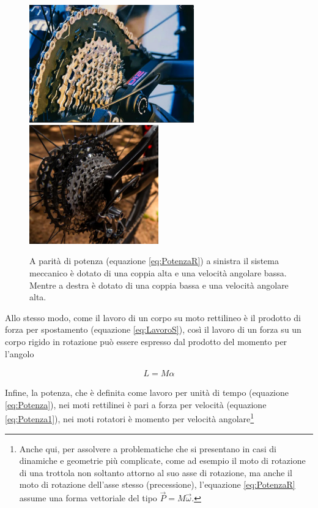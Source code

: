 \documentclass[17pt]{extarticle}
\begin{document}
\begin{figure}[ht!]		
	\centering
   	\includegraphics[width=2.8in]{coppiaAlta.png}
   	\includegraphics[width=2.2in]{coppiaBassa.png}
  	\caption{A parità di potenza (equazione \ref{eq:PotenzaR}) a sinistra il sistema meccanico è dotato di una coppia alta e una velocità angolare bassa. Mentre a destra è dotato di una coppia bassa e una velocità angolare alta.}
   	\label{fig:coppiaBassaAlta}
\end{figure}


Allo stesso modo, come il lavoro di un corpo su moto rettilineo è il prodotto di forza per spostamento (equazione \ref{eq:LavoroS}), così il lavoro di un forza su un corpo rigido in rotazione può essere espresso dal prodotto del momento per l'angolo

\begin{eqnarray}
	L = M\alpha
\end{eqnarray}

Infine, la potenza, che è definita come lavoro per unità di tempo (equazione \ref{eq:Potenza}), nei moti rettilinei è pari a forza per velocità (equazione \ref{eq:Potenza1}), nei moti rotatori è momento per velocità angolare\footnote{Anche qui, per assolvere a problematiche che si presentano in casi di dinamiche e geometrie più complicate, come ad esempio il moto di rotazione di una trottola non soltanto attorno al suo asse di rotazione, ma anche il moto di rotazione dell'asse stesso (precessione), l'equazione \ref{eq:PotenzaR} assume una forma vettoriale del tipo $\vec{P} = M\vec{\omega}$. }
\end{document}
